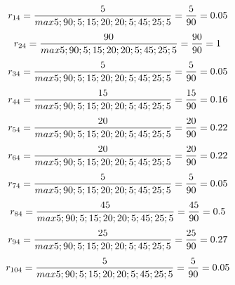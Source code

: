 \documentclass[a4paper,twoside]{article}
\begin{document}
\begin{enumerate}
\begin{enumerate}
\begin{displaymath}
r_{14} = \frac{5}{max {5;90;5;15;20;20;5;45;25;5}} = \frac{5}{90} = 0.05\\
\end {displaymath}
\begin{displaymath}
r_{24} = \frac{90}{max {5;90;5;15;20;20;5;45;25;5}} = \frac{90}{90} = 1\\
\end{displaymath}
\begin{displaymath}
r_{34} = \frac{5}{max {5;90;5;15;20;20;5;45;25;5}} = \frac{5}{90} = 0.05\\
\end {displaymath}
\begin{displaymath}
r_{44} = \frac{15}{max {5;90;5;15;20;20;5;45;25;5}} = \frac{15}{90} = 0.16\\
\end {displaymath}
\begin{displaymath}
r_{54} = \frac{20}{max {5;90;5;15;20;20;5;45;25;5}} = \frac{20}{90} = 0.22\\
\end {displaymath}
\begin{displaymath}
r_{64} = \frac{20}{max {5;90;5;15;20;20;5;45;25;5}} = \frac{20}{90} = 0.22\\
\end {displaymath}
\begin{displaymath}
r_{74} = \frac{5}{max {5;90;5;15;20;20;5;45;25;5}} = \frac{5}{90} = 0.05\\
\end {displaymath}
\begin{displaymath}
r_{84} = \frac{45}{max {5;90;5;15;20;20;5;45;25;5}} = \frac{45}{90} = 0.5\\
\end {displaymath}
\begin{displaymath}
r_{94} = \frac{25}{max {5;90;5;15;20;20;5;45;25;5}} = \frac{25}{90} = 0.27\\
\end {displaymath}
\begin{displaymath}
r_{104} = \frac{5}{max {5;90;5;15;20;20;5;45;25;5}} = \frac{5}{90} = 0.05\\
\end {displaymath}


\end{enumerate}
\end{enumerate}
\end{document}
